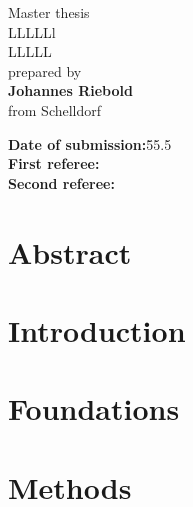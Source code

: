 \documentclass[12pt,a4paper,titlepage,headinclude,bibtotoc]{scrartcl}
\numberwithin{equation}{section}
\begin{document}

  \begin{titlepage}


    \vspace*{2cm} 

 \begin{center} \large 
    
    Master thesis\\
    \vspace*{2cm}
    {\huge LLLLLl\\}
    \vspace*{1.5cm}
   {\huge LLLLL}\\
   
    \vspace*{1.5cm}
	prepared by\\
	\vspace*{1cm}
   \textbf{\Large Johannes Riebold}\\
   \vspace*{1cm}
   from Schelldorf\\
   \vspace{2cm}
    \end{center}
    \begin{tabbing}
   \vspace*{1cm}
  \= \textbf{ Date of submission:}\= 55.5\\
   \vspace{0.8cm}
   \> \textbf{ First referee:} \>  \\
    \vspace*{0.3cm}
   \> \textbf{ Second referee:} \> 
    \end{tabbing}


    
    
 
\end{titlepage}
\newpage
\section*{Abstract}

\newpage
  \tableofcontents

\newpage

  



\newpage
  





\section{Introduction}
\label{sec:Einleitung}

\section{Foundations}

\section{Methods}
\label{sec:Methods}





\newpage


\end{document}

